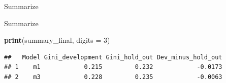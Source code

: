 \documentclass[9pt,ignorenonframetext,]{beamer}
\newenvironment{Shaded}{\begin{snugshade}}{\end{snugshade}}
\newcommand{\KeywordTok}[1]{\textcolor[rgb]{0.13,0.29,0.53}{\textbf{#1}}}
\newcommand{\DataTypeTok}[1]{\textcolor[rgb]{0.13,0.29,0.53}{#1}}
\newcommand{\DecValTok}[1]{\textcolor[rgb]{0.00,0.00,0.81}{#1}}
\newcommand{\StringTok}[1]{\textcolor[rgb]{0.31,0.60,0.02}{#1}}
\newcommand{\OtherTok}[1]{\textcolor[rgb]{0.56,0.35,0.01}{#1}}
\newcommand{\OperatorTok}[1]{\textcolor[rgb]{0.81,0.36,0.00}{\textbf{#1}}}
\newcommand{\NormalTok}[1]{#1}
\begin{document}
\begin{frame}[fragile]{Summarize}

\begin{Shaded}
\end{Shaded}

\end{frame}

\begin{frame}[fragile]{Summarize}

\begin{Shaded}
\begin{Highlighting}[]
\KeywordTok{print}\NormalTok{(summary_final, }\DataTypeTok{digits =} \DecValTok{3}\NormalTok{)}
\end{Highlighting}
\end{Shaded}

\begin{verbatim}
##   Model Gini_development Gini_hold_out Dev_minus_hold_out
## 1    m1            0.215         0.232            -0.0173
## 2    m3            0.228         0.235            -0.0063
\end{verbatim}

\end{frame}
\end{document}
